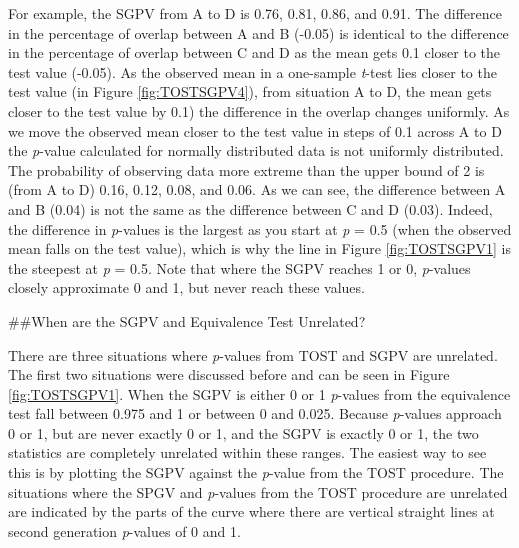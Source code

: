 \documentclass[,man,floatsintext]{apa6}
\begin{document}
For example, the SGPV from A to D is 0.76, 0.81, 0.86, and 0.91. The difference in the percentage of overlap between A and B (-0.05) is identical to the difference in the percentage of overlap between C and D as the mean gets 0.1 closer to the test value (-0.05).
As the observed mean in a one-sample \emph{t}-test lies closer to the test value (in Figure \ref{fig:TOSTSGPV4}), from situation A to D, the mean gets closer to the test value by 0.1) the difference in the overlap changes uniformly.
As we move the observed mean closer to the test value in steps of 0.1 across A to D the \emph{p}-value calculated for normally distributed data is not uniformly distributed. The probability of observing data more extreme than the upper bound of 2 is (from A to D) 0.16, 0.12, 0.08, and 0.06. As we can see, the difference between A and B (0.04) is not the same as the difference between C and D (0.03). Indeed, the difference in \emph{p}-values is the largest as you start at \emph{p} = 0.5 (when the observed mean falls on the test value), which is why the line in Figure \ref{fig:TOSTSGPV1} is the steepest at \emph{p} = 0.5. Note that where the SGPV reaches 1 or 0, \emph{p}-values closely approximate 0 and 1, but never reach these values.

\#\#When are the SGPV and Equivalence Test Unrelated?

There are three situations where \emph{p}-values from TOST and SGPV are unrelated. The first two situations were discussed before and can be seen in Figure \ref{fig:TOSTSGPV1}. When the SGPV is either 0 or 1 \emph{p}-values from the equivalence test fall between 0.975 and 1 or between 0 and 0.025. Because \emph{p}-values approach 0 or 1, but are never exactly 0 or 1, and the SGPV is exactly 0 or 1, the two statistics are completely unrelated within these ranges. The easiest way to see this is by plotting the SGPV against the \emph{p}-value from the TOST procedure. The situations where the SPGV and \emph{p}-values from the TOST procedure are unrelated are indicated by the parts of the curve where there are vertical straight lines at second generation \emph{p}-values of 0 and 1.
\end{document}
